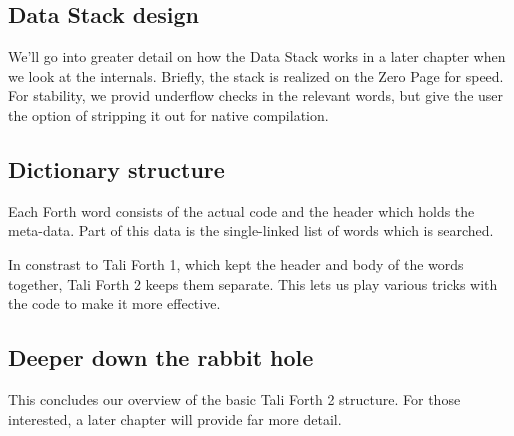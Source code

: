 \subsection{Data Stack design}

We'll go into greater detail on how the Data Stack works in a later chapter when
we look at the internals. Briefly, the stack is realized on the Zero
Page for speed. For stability, we provid underflow
checks in the relevant words, but give the user the
option of stripping it out for native compilation.


\subsection{Dictionary structure}

Each Forth word consists of the actual code and the header which
holds the meta-data. Part of this data is the single-linked list of words which
is searched. 

In constrast to Tali Forth 1, which kept the header and body
of the words together, Tali Forth 2 keeps them separate. This lets us play
various tricks with the code to make it more effective.

\subsection{Deeper down the rabbit hole}

This concludes our overview of the basic Tali Forth 2 structure. For those
interested, a later chapter will provide far more detail.
